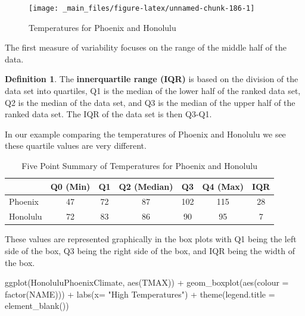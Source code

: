 \documentclass[
]{book}
\newenvironment{Shaded}{\begin{snugshade}}{\end{snugshade}}
\newcommand{\AttributeTok}[1]{\textcolor[rgb]{0.77,0.63,0.00}{#1}}
\newcommand{\FunctionTok}[1]{\textcolor[rgb]{0.00,0.00,0.00}{#1}}
\newcommand{\NormalTok}[1]{#1}
\newcommand{\SpecialCharTok}[1]{\textcolor[rgb]{0.00,0.00,0.00}{#1}}
\newcommand{\StringTok}[1]{\textcolor[rgb]{0.31,0.60,0.02}{#1}}
\theoremstyle{definition}
\newtheorem{definition}{Definition}[chapter]
\theoremstyle{definition}
\theoremstyle{definition}
\theoremstyle{definition}
\theoremstyle{remark}
\begin{document}
\begin{figure}

{\centering \texttt{[image: \_main\_files/figure-latex/unnamed-chunk-186-1]} 

}

\caption{Temperatures for Phoenix and Honolulu}\label{fig:unnamed-chunk-186}
\end{figure}

The first measure of variability focuses on the range of the middle half of the data.

\begin{definition}
The \textbf{innerquartile range (IQR)} is based on the division of the data set into quartiles, Q1 is the median of the lower half of the ranked data set, Q2 is the median of the data set, and Q3 is the median of the upper half of the ranked data set. The IQR of the data set is then Q3-Q1.
\end{definition}

In our example comparing the temperatures of Phoenix and Honolulu we see these quartile values are very different.

\begin{table}

\caption{\label{tab:unnamed-chunk-188}Five Point Summary of Temperatures for Phoenix and Honolulu}
\centering
\begin{tabular}[t]{lcccccc}
\toprule
  & Q0 (Min) & Q1 & Q2 (Median) & Q3 & Q4 (Max) & IQR\\
\midrule
Phoenix & 47 & 72 & 87 & 102 & 115 & 28\\
Honolulu & 72 & 83 & 86 & 90 & 95 & 7\\
\bottomrule
\end{tabular}
\end{table}

These values are represented graphically in the box plots with Q1 being the left side of the box, Q3 being the right side of the box, and IQR being the width of the box.

\begin{Shaded}
\begin{Highlighting}[]
\FunctionTok{ggplot}\NormalTok{(HonoluluPhoenixClimate, }\FunctionTok{aes}\NormalTok{(TMAX)) }\SpecialCharTok{+} \FunctionTok{geom\_boxplot}\NormalTok{(}\FunctionTok{aes}\NormalTok{(}\AttributeTok{colour =} \FunctionTok{factor}\NormalTok{(NAME))) }\SpecialCharTok{+} \FunctionTok{labs}\NormalTok{(}\AttributeTok{x=} \StringTok{"High Temperatures"}\NormalTok{) }\SpecialCharTok{+} \FunctionTok{theme}\NormalTok{(}\AttributeTok{legend.title =} \FunctionTok{element\_blank}\NormalTok{())}
\end{Highlighting}
\end{Shaded}
\end{document}
